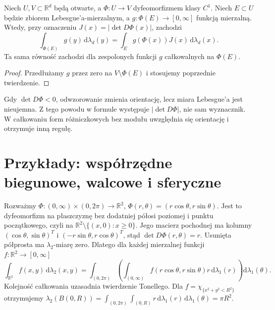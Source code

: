 \begin{wniosek}
\label{cor:change-subdomain-13}
Niech $U,V\subset\mathbb R^d$ będą otwarte,
a $\Phi:U\to V$ dyfeomorfizmem klasy $C^1$.
Niech $E\subset U$ będzie zbiorem Lebesgue'a-mierzalnym,
a $g:\Phi(E)\to[0,\infty]$ funkcją mierzalną.
Wtedy, przy oznaczeniu
$J(x)=|\det D\Phi(x)|$, zachodzi
\[
\int_{\Phi(E)}g(y)\,\mathrm d\lambda_d(y)
=\int_E g(\Phi(x))J(x)\,\mathrm d\lambda_d(x).
\]
Ta sama równość zachodzi dla zespolonych funkcji $g$
całkowalnych na $\Phi(E)$.
\end{wniosek}
\begin{proof}
Przedłużamy $g$ przez zero na $V\setminus\Phi(E)$
i stosujemy poprzednie twierdzenie.
\end{proof}

\begin{uwaga}
Gdy $\det D\Phi<0$, odwzorowanie zmienia orientację,
lecz miara Lebesgue'a jest nieujemna. Z tego powodu
w formule występuje $|\det D\Phi|$, nie sam wyznacznik.
W całkowaniu form różniczkowych bez modułu uwzględnia się
orientację i otrzymuje inną regułę.
\end{uwaga}

\section{Przykłady: współrzędne biegunowe, walcowe i sferyczne}

\begin{przyklad}
\label{ex:polar-13}
Rozważmy $\Phi:(0,\infty)\times(0,2\pi)\to\mathbb R^2$,
$\Phi(r,\theta)=(r\cos\theta,r\sin\theta)$.
Jest to dyfeomorfizm na płaszczyznę bez dodatniej
półosi poziomej i punktu początkowego, czyli na
$\mathbb R^2\setminus\{(x,0):x\ge0\}$.
Jego macierz pochodnej ma kolumny
$(\cos\theta,\sin\theta)^T$ i
$(-r\sin\theta,r\cos\theta)^T$, stąd
$\det D\Phi(r,\theta)=r$. Usunięta półprosta ma
$\lambda_2$-miarę zero. Dlatego dla każdej
mierzalnej funkcji $f:\mathbb R^2\to[0,\infty]$
\begin{equation}\label{eq:polar-13}
\int_{\mathbb R^2}f(x,y)\,\mathrm d\lambda_2(x,y)
=\int_{(0,2\pi)}\left(\int_{(0,\infty)}
 f(r\cos\theta,r\sin\theta)r\,\mathrm d\lambda_1(r)\right)
\mathrm d\lambda_1(\theta).
\end{equation}
Kolejność całkowania uzasadnia twierdzenie Tonellego.
Dla $f=\chi_{\{x^2+y^2<R^2\}}$ otrzymujemy
$\lambda_2(B(0,R))=\int_{(0,2\pi)}\int_{(0,R)}r\,
\mathrm d\lambda_1(r)\,\mathrm d\lambda_1(\theta)=\pi R^2$.
\end{przyklad}

